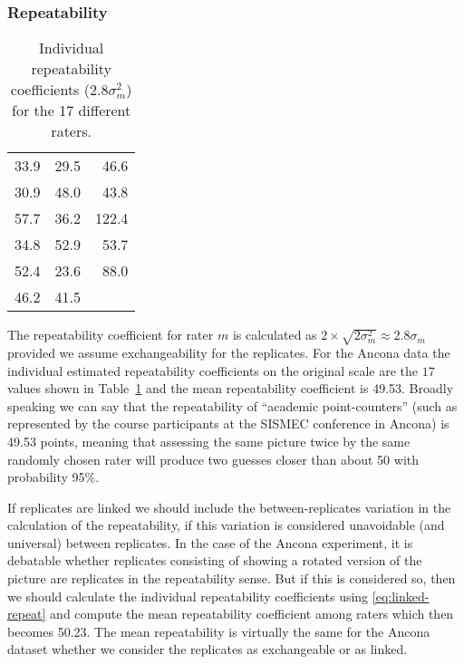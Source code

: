 \documentclass[aoas]{imsart}
\begin{document}
\subsubsection{Repeatability}


\begin{table}[t]
\centering
\caption{Individual repeatability coefficients ($2.8\sigma_m^2$) for the 17 different raters.} 
\label{ratertable}
\begin{tabular}{rrr}
  \hline
  \hline
33.9 & 29.5 & 46.6 \\ 
  30.9 & 48.0 & 43.8 \\ 
  57.7 & 36.2 & 122.4 \\ 
  34.8 & 52.9 & 53.7 \\ 
  52.4 & 23.6 & 88.0 \\ 
  46.2 & 41.5 &  \\ 
   \hline
\end{tabular}
\end{table}
The repeatability coefficient for rater $m$ is calculated as $2
\times \sqrt{2 \sigma_m^2}\approx 2.8\sigma_m$ provided we assume
exchangeability for the replicates.
For the Ancona data the individual estimated repeatability coefficients on the
original scale are the $17$ values shown in Table~\ref{ratertable} and
the mean repeatability coefficient is
49.53.  Broadly speaking we
can say that the repeatability of ``academic point-counters'' (such as
represented by the course participants at the SISMEC conference in
Ancona) is 49.53 points,
meaning that assessing the same picture twice by the same randomly
chosen rater will
produce two guesses closer than about 50 with probability 95\%.






If replicates are linked we should include the between-replicates
variation in the calculation of the repeatability, if this variation
is considered unavoidable (and universal) between replicates.  In the case of the
Ancona experiment, it is debatable whether replicates consisting of
showing a rotated version of the picture are replicates in the
repeatability sense. But if this is considered so, then we should
calculate the individual repeatability coefficients using
\eqref{eq:linked-repeat} and compute the mean repeatability
coefficient among raters which then becomes
50.23.  The mean
repeatability is virtually the same for the Ancona dataset whether we
consider the replicates as exchangeable or as linked.
\end{document}
